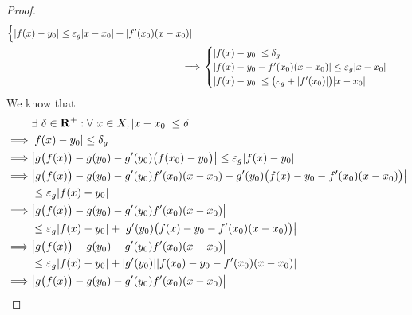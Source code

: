\begin{proof}
\begin{align*}
\begin{cases}
            \abs*{f(x) - y_0} \leq \varepsilon_g \abs*{x - x_0} + \abs*{f'(x_0) (x - x_0)}
        \end{cases}                                                      \\
        \implies & \begin{cases}
            \abs*{f(x) - y_0} \leq \delta_g                                         \\
            \abs*{f(x) - y_0 - f'(x_0) (x - x_0)} \leq \varepsilon_g \abs*{x - x_0} \\
            \abs*{f(x) - y_0} \leq \big(\varepsilon_g + \abs*{f'(x_0)}\big) \abs*{x - x_0}
        \end{cases}
    \end{align*}
    We know that
    \begin{align*}
                 & \exists\ \delta \in \mathbf{R}^+ : \forall\ x \in X, \abs*{x - x_0} \leq \delta                                          \\
        \implies & \abs*{f(x) - y_0} \leq \delta_g                                                                                          \\
        \implies & \abs*{g\big(f(x)\big) - g(y_0) - g'(y_0) \big(f(x_0) - y_0\big)} \leq \varepsilon_g \abs*{f(x) - y_0}                    \\
        \implies & \abs*{g\big(f(x)\big) - g(y_0) - g'(y_0) f'(x_0) (x - x_0) - g'(y_0) \big(f(x) - y_0 - f'(x_0) (x - x_0)\big)}           \\
                 & \leq \varepsilon_g \abs*{f(x) - y_0}                                                                                     \\
        \implies & \abs*{g\big(f(x)\big) - g(y_0) - g'(y_0) f'(x_0) (x - x_0)}                                                              \\
                 & \leq \varepsilon_g \abs*{f(x) - y_0} + \abs*{g'(y_0) \big(f(x) - y_0 - f'(x_0) (x - x_0)\big)}                           \\
        \implies & \abs*{g\big(f(x)\big) - g(y_0) - g'(y_0) f'(x_0) (x - x_0)}                                                              \\
                 & \leq \varepsilon_g \abs*{f(x) - y_0} + \abs*{g'(y_0)} \abs*{f(x_0) - y_0 - f'(x_0) (x - x_0)}                            \\
        \implies & \abs*{g\big(f(x)\big) - g(y_0) - g'(y_0) f'(x_0) (x - x_0)}                                                              \\

\end{align*}
\end{proof}
